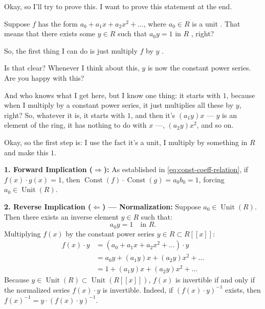 \begin{proofWrapper}

\begin{speech}[00:37:45 - 00:39:07]
Okay, so I'll try to prove this. I want to prove this statement at the end.

Suppose $f$ has the form $a_0 + a_1 x + a_2 x^2 + \dots$, where $a_0 \in R$ is a unit . That means that there exists some $y \in R$ such that $a_0 y = 1$ in $R$ , right?

So, the first thing I can do is just multiply $f$ by $y$ .

Is that clear? Whenever I think about this, $y$ is now the constant power series. Are you happy with this?

And who knows what I get here, but I know one thing: it starts with $1$, because when I multiply by a constant power series, it just multiplies all these by $y$, right? So, whatever it is, it starts with $1$, and then it's $(a_1 y) x$  --- $y$ is an element of the ring, it has nothing to do with $x$ ---, $(a_2 y) x^2$, and so on.

Okay, so the first step is: I use the fact it's a unit, I multiply by something in $R$ and make this $1$.
\end{speech}

\begin{content}
\textbf{1. Forward Implication ($\Rightarrow$):}
As established in \eqref{eq:const-coeff-relation}, if $f(x) \cdot g(x) = 1$, then $\operatorname{Const}(f) \cdot \operatorname{Const}(g) = a_0 b_0 = 1$, forcing $a_0 \in \operatorname{Unit}(R)$.

\textbf{2. Reverse Implication ($\Leftarrow$) --- Normalization:}
Suppose $a_0 \in \operatorname{Unit}(R)$. Then there exists an inverse element $y \in R$ such that:
\begin{equation}\label{eq:y-inverse-a0}
a_0 y = 1 \quad \text{in } R.
\end{equation}
Multiplying $f(x)$ by the constant power series $y \in R \subset R[[x]]$:
\begin{align}
    f(x) \cdot y &= (a_0 + a_1 x + a_2 x^2 + \dots) \cdot y \nonumber \\
    &= a_0 y + (a_1 y) x + (a_2 y) x^2 + \dots \nonumber \\
    &= 1 + (a_1 y) x + (a_2 y) x^2 + \dots \label{eq:normalized-series-fy}
\end{align}
Because $y \in \operatorname{Unit}(R) \subset \operatorname{Unit}(R[[x]])$, $f(x)$ is invertible if and only if the normalized series $f(x) \cdot y$ is invertible. Indeed, if $(f(x) \cdot y)^{-1}$ exists, then $f(x)^{-1} = y \cdot (f(x) \cdot y)^{-1}$.
\end{content}


\end{proofWrapper}
